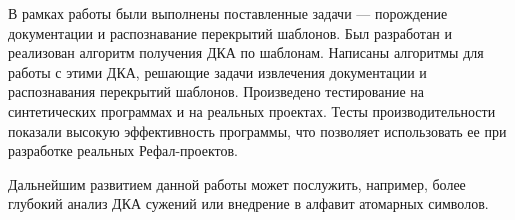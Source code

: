 
В рамках работы были выполнены поставленные задачи --- порождение документации и распознавание перекрытий шаблонов. Был разработан и реализован алгоритм получения 
ДКА по шаблонам. Написаны алгоритмы для работы с этими ДКА, решающие задачи извлечения документации и распознавания перекрытий шаблонов. Произведено тестирование на синтетических программах и на реальных 
проектах. Тесты производительности показали высокую эффективность программы, что позволяет использовать ее при разработке реальных Рефал-проектов.

Дальнейшим развитием данной работы может послужить, например, более глубокий анализ 
ДКА сужений или внедрение в алфавит атомарных символов.
\printbibliography[title={СПИСОК ИСПОЛЬЗОВАННЫХ ИСТОЧНИКОВ},heading=bibintoc]


